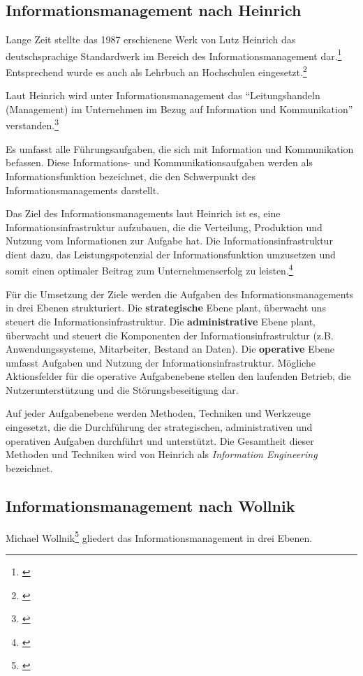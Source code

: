 \subsection{Informationsmanagement nach Heinrich}

Lange Zeit stellte das 1987 erschienene Werk von Lutz Heinrich das deutschsprachige Standardwerk im Bereich des Informationsmanagement dar.\footnote{\cite{heinrich_informationsmanagement_2005}} Entsprechend wurde es auch als Lehrbuch an Hochschulen eingesetzt.\footnote{\cite{heinrich_inm_2002}}

Laut Heinrich wird unter Informationsmanagement das “Leitungshandeln (Management) im Unternehmen im Bezug auf Information und Kommunikation” verstanden.\footnote{\cite{heinrich_informationsmanagement_2005}}

Es umfasst alle Führungsaufgaben, die sich mit Information und Kommunikation befassen. Diese Informations- und Kommunikationsaufgaben werden als Informationsfunktion bezeichnet, die den Schwerpunkt des Informationsmanagements darstellt. 

Das Ziel des Informationsmanagements laut Heinrich ist es, eine Informationsinfrastruktur aufzubauen, die die Verteilung, Produktion und Nutzung vom Informationen zur Aufgabe hat. Die Informationsinfrastruktur dient dazu, das Leistungspotenzial der Informationsfunktion umzusetzen und somit einen optimaler Beitrag zum Unternehmenserfolg zu leisten.\footnote{\cite{heinrich_inm_2002}}

Für die Umsetzung der Ziele werden die Aufgaben des Informationsmanagements in drei Ebenen strukturiert.
Die \textbf{strategische} Ebene plant, überwacht uns steuert die Informationsinfrastruktur.
Die \textbf{administrative} Ebene plant, überwacht und steuert die Komponenten der Informationsinfrastruktur (z.B. Anwendungssysteme, Mitarbeiter, Bestand an Daten).
Die \textbf{operative} Ebene umfasst Aufgaben und Nutzung der Informationsinfrastruktur. Mögliche Aktionsfelder für die operative Aufgabenebene stellen den laufenden Betrieb, die Nutzerunterstützung und die Störungsbeseitigung dar.

Auf jeder Aufgabenebene werden Methoden, Techniken und Werkzeuge eingesetzt, die die Durchführung 
der strategischen, administrativen und operativen Aufgaben durchführt und unterstützt.
Die Gesamtheit dieser Methoden und Techniken wird von Heinrich als \emph{Information Engineering} bezeichnet.

\subsection{Informationsmanagement nach Wollnik}
Michael Wollnik\footnote{\cite{wollnik_referenzmodell_1988}} gliedert das Informationsmanagement in drei Ebenen.

